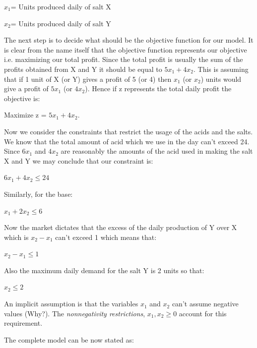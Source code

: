 $x _1$= Units produced daily of salt X



$x _2$= Units produced daily of salt Y



The next step is to decide what should be the objective function for our model. It is
clear from the name itself that the objective function represents our objective i.e.
maximizing our total profit. Since the total profit is usually the sum of the profits
obtained from X and Y it should be equal to $5x _1+4x _2$. This is assuming that if 1 unit
of X (or Y) gives a profit of 5 (or 4) then $x _1$ (or $x _2$) units would give a profit
of $5x _1$ (or $4x _2$). Hence if z represents the total daily profit the objective is:



Maximize z = $5x _1+4x _2$.



Now we consider the constraints that restrict the usage of the acids and the salts. We
know that the total amount of acid which we use in the day can't exceed 24. Since $6x _1$
and $4x _2$ are reasonably the amounts of the acid used in making the salt X and Y we may
conclude that our constraint is:



$6x _1+4x _2\le 24$



Similarly, for the base:



$x _1+2x _2\le 6$



Now the market dictates that the excess of the daily production of Y over X which is $x
_2-x _1$ can't exceed 1 which means that:



$x _2-x _1\le 1$



Also the maximum daily demand for the salt Y is 2 units so that:



$x _2\le 2$



An implicit assumption is that the variables $x _1$ and $x _2$ can't assume negative
values (Why?). The \textit{nonnegativity restrictions}, $x _1,x _2\ge 0$ account for this
requirement.



The complete model can be now stated as:



